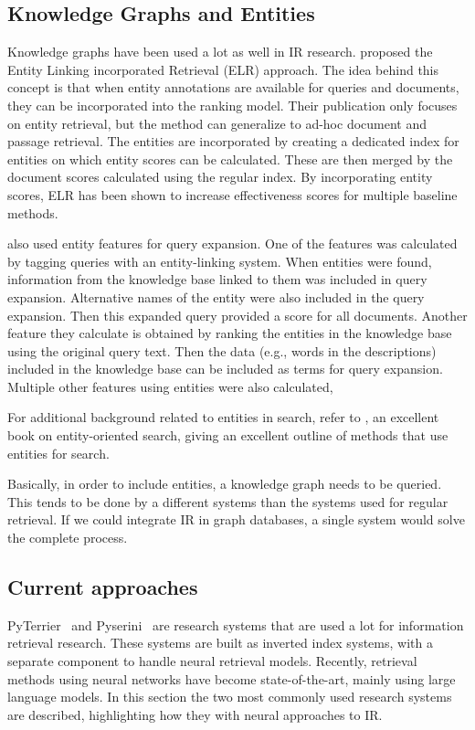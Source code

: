 \subsection{Knowledge Graphs and Entities}
Knowledge graphs have been used a lot as well in IR research.  proposed the Entity Linking incorporated Retrieval (ELR) approach. The idea behind this concept is that when entity annotations are available for queries and documents, they can be incorporated into the ranking model. Their publication only focuses on entity retrieval, but the method can generalize to ad-hoc document and passage retrieval. The entities are incorporated by creating a dedicated index for entities on which entity scores can be calculated. These are then merged by the document scores calculated using the regular index. By incorporating entity scores, ELR has been shown to increase effectiveness scores for multiple baseline methods. 

 also used entity features for query expansion. One of the features was calculated by tagging queries with an entity-linking system. When entities were found, information from the knowledge base linked to them was included in query expansion. Alternative names of the entity were also included in the query expansion. Then this expanded query provided a score for all documents. Another feature they calculate is obtained by ranking the entities in the knowledge base using the original query text. Then the data (e.g., words in the descriptions) included in the knowledge base can be included as terms for query expansion. Multiple other features using entities were also calculated, 

For additional background related to entities in search, refer to , an excellent book on entity-oriented search, giving an excellent outline of methods that use entities for search. 

Basically, in order to include entities, a knowledge graph needs to be queried. This tends to be done by a different systems than the systems used for regular retrieval. If we could integrate IR in graph databases, a single system would solve the complete process.

\subsection{Current approaches}
PyTerrier~\citep{pyterrier} and Pyserini~\citep{pyserini} are research systems that are used a lot for information retrieval research. These systems are built as inverted index systems, with a separate component to handle neural retrieval models. Recently, retrieval methods using neural networks have become state-of-the-art, mainly using large language models. In this section the two most commonly used research systems are described, highlighting how they with neural approaches to IR.


